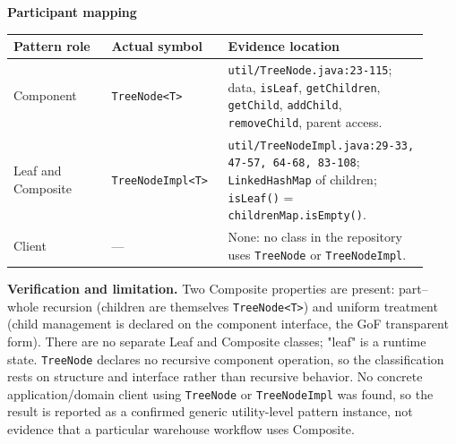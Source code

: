 \documentclass[11pt,a4paper]{article}
\newcommand{\code}[1]{\nolinkurl{#1}}
\begin{document}
\textbf{Participant mapping}\par\smallskip
\noindent\begin{tabular}{@{}P{0.22\linewidth}P{0.25\linewidth}P{0.45\linewidth}@{}}
\toprule
Pattern role & Actual symbol & Evidence location\\
\midrule
Component & \code{TreeNode<T>} & \code{util/TreeNode.java:23-115}; data, \code{isLeaf}, \code{getChildren}, \code{getChild}, \code{addChild}, \code{removeChild}, parent access.\\
Leaf and Composite & \code{TreeNodeImpl<T>} & \code{util/TreeNodeImpl.java:29-33, 47-57, 64-68, 83-108}; \code{LinkedHashMap} of children; \code{isLeaf()} = \code{childrenMap.isEmpty()}.\\
Client & --- & None: no class in the repository uses \code{TreeNode} or \code{TreeNodeImpl}.\\
\bottomrule
\end{tabular}

\begin{center}
\end{center}

\textbf{Verification and limitation.} Two Composite properties are present: part--whole recursion (children are themselves \code{TreeNode<T>}) and uniform treatment (child management is declared on the component interface, the GoF transparent form). There are no separate Leaf and Composite classes; "leaf" is a runtime state. \code{TreeNode} declares no recursive component operation, so the classification rests on structure and interface rather than recursive behavior. No concrete application/domain client using \code{TreeNode} or \code{TreeNodeImpl} was found, so the result is reported as a confirmed generic utility-level pattern instance, not evidence that a particular warehouse workflow uses Composite.
\end{document}

